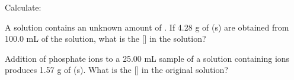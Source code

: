\documentclass[fleqn]{exam}
\begin{document}
\begin{questions}
  Calculate:

  \question A solution contains an unknown amount of . If 4.28 g of (s) are obtained from 100.0 mL of the solution, what is the [] in the solution?
  \vspace{1.5in}

  \question Addition of phosphate ions to a 25.00 mL sample of a solution containing  ions produces 1.57 g of (s). What is the [] in the original solution?

\end{questions}
\end{document}

